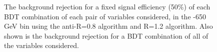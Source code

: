 \begin{figure}
\begin{center}
\caption{The background rejection
for a fixed signal efficiency (50\%) of each BDT combination of
each pair of variables considered, in the -650 GeV bin using the anti-\kT R=0.8
algorithm and R=1.2 algorithm. Also shown is the background rejection
for a BDT combination of all of the variables considered.}
\label{fig:pt500_comb2D}
\end{center}
\end{figure}

